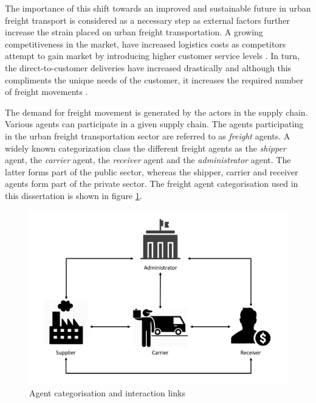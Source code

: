 The importance of this shift towards an improved and sustainable future in urban freight transport is considered as a necessary step \citep{savelsbergh201650th,macharis2014stakeholder,lindholm2012challenges} as external factors further increase the strain placed on urban freight transportation. A growing competitiveness in the market, have increased logistics costs as competitors attempt to gain market by introducing higher customer service levels \citep{lozano2013cooperative}. In turn, the direct-to-customer deliveries have increased drastically and although this compliments the unique needs of the customer, it increases the required number of freight movements \citep{savelsbergh201650th}. 

The demand for freight movement is generated by the actors in the supply chain. Various agents can participate in a given supply chain. The agents participating in the urban freight transportation sector are referred to as \textit{freight} agents. A widely known categorization class the different freight agents as the \textit{shipper} agent, the \textit{carrier} agent, the \textit{receiver} agent and the \textit{administrator} agent. The latter forms part of the public sector, whereas the shipper, carrier and receiver agents form part of the private sector. The freight agent categorisation used in this dissertation is shown in figure \ref{agent_interact}.

\begin{figure}[ht]
    \centering
    \includegraphics{images/agent_interact.PNG}
    \caption{Agent categorisation and interaction links}
    \label{agent_interact}
\end{figure}

